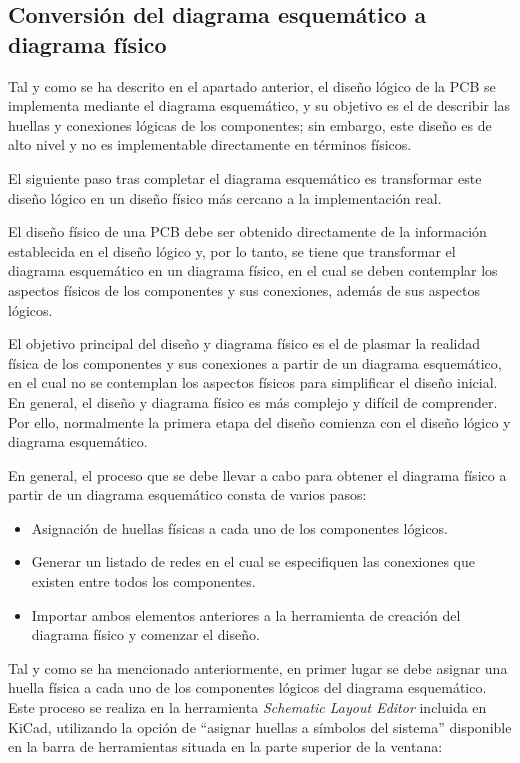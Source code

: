 \subsection{Conversión del diagrama esquemático a diagrama físico}

Tal y como se ha descrito en el apartado anterior, el diseño lógico de la \ac{PCB} se implementa mediante el diagrama esquemático, y su objetivo es el de describir las huellas y conexiones lógicas de los componentes; sin embargo, este diseño es de alto nivel y no es implementable directamente en términos físicos. 

El siguiente paso tras completar el diagrama esquemático es transformar este diseño lógico en un diseño físico más cercano a la implementación real. 

El diseño físico de una \ac{PCB} debe ser obtenido directamente de la información establecida en el diseño lógico y, por lo tanto, se tiene que transformar el diagrama esquemático en un diagrama físico, en el cual se deben contemplar los aspectos físicos de los componentes y sus conexiones, además de sus aspectos lógicos.

El objetivo principal del diseño y diagrama físico es el de plasmar la realidad física de los componentes y sus conexiones a partir de un diagrama esquemático, en el cual no se contemplan los aspectos físicos para simplificar el diseño inicial. En general, el diseño y diagrama físico es más complejo y difícil de comprender. Por ello, normalmente la primera etapa del diseño comienza con el diseño lógico y diagrama esquemático.

En general, el proceso que se debe llevar a cabo para obtener el diagrama físico a partir de un diagrama esquemático consta de varios pasos:
\begin{itemize}
    \item Asignación de huellas físicas a cada uno de los componentes lógicos.
    \item Generar un listado de redes en el cual se especifiquen las conexiones que existen entre todos los componentes.
    \item Importar ambos elementos anteriores a la herramienta de creación del diagrama físico y comenzar el diseño.
\end{itemize}

Tal y como se ha mencionado anteriormente, en primer lugar se debe asignar una huella física a cada uno de los componentes lógicos del diagrama esquemático. Este proceso se realiza en la herramienta \textit{Schematic Layout Editor} incluida en KiCad, utilizando la opción de ``asignar huellas a símbolos del sistema'' disponible en la barra de herramientas situada en la parte superior de la ventana:

